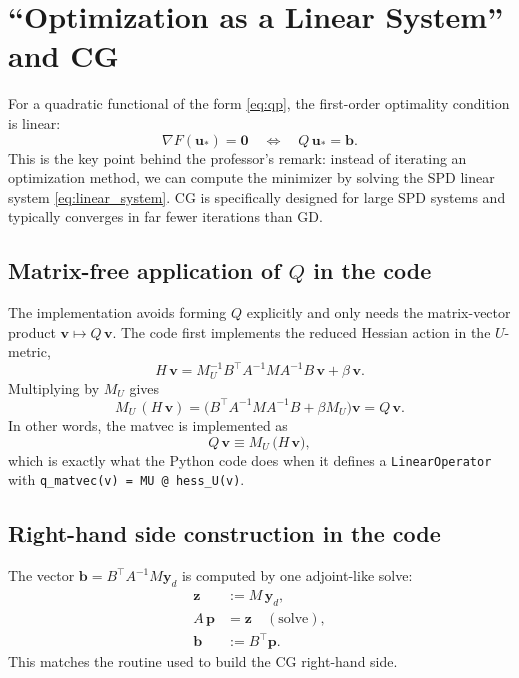 \documentclass[11pt,a4paper]{article}
\begin{document}
\section{``Optimization as a Linear System'' and CG}
For a quadratic functional of the form \eqref{eq:qp}, the first-order optimality condition is linear:
\begin{equation}
  \nabla F(\mathbf{u}_*) = \mathbf{0}
  \quad\Longleftrightarrow\quad
  Q\,\mathbf{u}_* = \mathbf{b}.
  \label{eq:linear_system}
\end{equation}
This is the key point behind the professor's remark: instead of iterating an optimization method, we can compute the minimizer by solving the SPD linear system \eqref{eq:linear_system}. CG is specifically designed for large SPD systems and typically converges in far fewer iterations than GD.

\subsection{Matrix-free application of $Q$ in the code}
The implementation avoids forming $Q$ explicitly and only needs the matrix-vector product $\mathbf{v}\mapsto Q\,\mathbf{v}$. The code first implements the reduced Hessian action in the $U$-metric,
\begin{equation}
  H\,\mathbf{v} = M_U^{-1} B^\top A^{-1} M A^{-1} B\,\mathbf{v} + \beta\,\mathbf{v}.
\end{equation}
Multiplying by $M_U$ gives
\begin{equation}
  M_U\,(H\,\mathbf{v}) = \big(B^\top A^{-1} M A^{-1} B + \beta M_U\big)\mathbf{v} = Q\,\mathbf{v}.
\end{equation}
In other words, the matvec is implemented as
\begin{equation}
  Q\,\mathbf{v} \equiv M_U\,\big(H\,\mathbf{v}\big),
\end{equation}
which is exactly what the Python code does when it defines a \texttt{LinearOperator} with \texttt{q\_matvec(v) = MU @ hess\_U(v)}.

\subsection{Right-hand side construction in the code}
The vector $\mathbf{b}=B^\top A^{-1}M\mathbf{y}_d$ is computed by one adjoint-like solve:
\begin{align}
  \mathbf{z} &:= M\,\mathbf{y}_d,\\
  A\,\mathbf{p} &= \mathbf{z}\quad(\text{solve}),\\
  \mathbf{b} &:= B^\top\mathbf{p}.
\end{align}
This matches the routine used to build the CG right-hand side.
\end{document}
